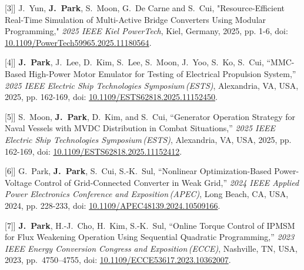 \documentclass[letterpaper,11pt]{article}
\newlength{\publicationNumberWidth}
\newcommand{\publicationNumberLabel}[1]{\makebox[\publicationNumberWidth][l]{\small [#1]}}
\begin{document}
    \item[\publicationNumberLabel{3}]\small{
      J.~Yun, \textbf{J.~Park}, S.~Moon, G.~De Carne and S.~Cui, 
      "Resource-Efficient Real-Time Simulation of Multi-Active Bridge Converters Using 
      Modular Programming," \textit{2025 IEEE Kiel PowerTech}, Kiel, Germany, 2025, pp. 1-6,
      doi: \href{https://ieeexplore.ieee.org/document/11180564}{10.1109/PowerTech59965.2025.11180564}.
    }\vspace{-2pt}


    \item[\publicationNumberLabel{4}]\small{
      \textbf{J.~Park}, J.~Lee, D.~Kim, S.~Lee, S.~Moon, J.~Yoo, S.~Ko, S.~Cui,
      ``MMC-Based High-Power Motor Emulator for Testing of Electrical Propulsion System,''
      \textit{2025 IEEE Electric Ship Technologies Symposium\,(ESTS)}, Alexandria, VA, USA, 2025, pp. 162-169,
      doi: \href{https://ieeexplore.ieee.org/document/11152450}{10.1109/ESTS62818.2025.11152450}.
    }\vspace{-2pt}


    \item[\publicationNumberLabel{5}]\small{
      S.~Moon, \textbf{J.~Park}, D.~Kim, and S.~Cui,
      ``Generator Operation Strategy for Naval Vessels with MVDC Distribution in Combat Situations,''
      \textit{2025 IEEE Electric Ship Technologies Symposium\,(ESTS)}, Alexandria, VA, USA, 2025, pp. 162-169,
      doi: \href{https://ieeexplore.ieee.org/document/11152412}{10.1109/ESTS62818.2025.11152412}.
    }\vspace{-2pt}


    \item[\publicationNumberLabel{6}]\small{
      G.~Park, \textbf{J.~Park}, S.~Cui, S.-K.~Sul,
      ``Nonlinear Optimization-Based Power-Voltage Control of Grid-Connected Converter in
      Weak Grid,''
      \textit{2024 IEEE Applied Power Electronics Conference and Exposition\,(APEC)}, Long Beach, CA, USA, 2024, pp. 228-233,
      doi: \href{https://ieeexplore.ieee.org/document/10509166}{10.1109/APEC48139.2024.10509166}.
    }\vspace{-2pt}

    \item[\publicationNumberLabel{7}]\small{
     \textbf{J.~Park}, H.-J.~Cho, H.~Kim, S.-K.~Sul,
      ``Online Torque Control of IPMSM for Flux Weakening Operation Using Sequential
      Quadratic Programming,''
      \textit{2023 IEEE Energy Conversion Congress and Exposition\,(ECCE)}, Nashville, TN, USA, 2023, pp.~4750--4755,
      doi: \href{https://ieeexplore.ieee.org/document/10362007}{10.1109/ECCE53617.2023.10362007}.
    }\vspace{-2pt}
\end{document}
